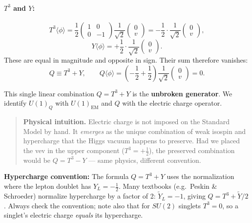 \documentclass[12pt,a4paper]{article}
\newcommand{\nt}[1]{\begin{note}#1\end{note}}
\begin{document}
\paragraph{$T^3$ and $Y$:}
\begin{equation}
  T^3\langle\phi\rangle
  = \frac{1}{2}\begin{pmatrix}1&0\\0&-1\end{pmatrix}\frac{1}{\sqrt{2}}\begin{pmatrix}0\\v\end{pmatrix}
  = -\frac{1}{2}\cdot\frac{1}{\sqrt{2}}\begin{pmatrix}0\\v\end{pmatrix} ,
  \label{eq:sg:T3_on_vev}
\end{equation}
\begin{equation}
  Y\langle\phi\rangle = +\frac{1}{2}\cdot\frac{1}{\sqrt{2}}\begin{pmatrix}0\\v\end{pmatrix} .
  \label{eq:sg:Y_on_vev}
\end{equation}
These are equal in magnitude and opposite in sign. Their sum therefore vanishes:
\begin{equation}
  \boxed{\;
  Q \equiv T^3 + Y ,
  \qquad
  Q\langle\phi\rangle = \left(-\frac{1}{2} + \frac{1}{2}\right)\frac{1}{\sqrt{2}}\begin{pmatrix}0\\v\end{pmatrix} = 0 .
  \;}
  \label{eq:sg:Q_unbroken}
\end{equation}

This single linear combination $Q = T^3 + Y$ is the \textbf{unbroken generator}. We identify $U(1)_Q$ with $U(1)_{\mathrm{EM}}$ and $Q$ with the electric charge operator.

\begin{quote}
  \textbf{Physical intuition.} Electric charge is not imposed on the Standard Model by hand. It \emph{emerges} as the unique combination of weak isospin and hypercharge that the Higgs vacuum happens to preserve. Had we placed the vev in the upper component ($T^3 = +\tfrac{1}{2}$), the preserved combination would be $Q = T^3 - Y$ — same physics, different convention.
\end{quote}

\nt{\textbf{Hypercharge convention:} The formula $Q = T^3 + Y$ uses the normalization where the lepton doublet has $Y_{L} = -\tfrac{1}{2}$. Many textbooks (e.g.\ Peskin \& Schroeder) normalize hypercharge by a factor of 2: $\tilde{Y}_L = -1$, giving $Q = T^3 + \tilde{Y}/2$. Always check the convention; note also that for $SU(2)$ singlets $T^3 = 0$, so a singlet's electric charge \emph{equals} its hypercharge.}
\end{document}

